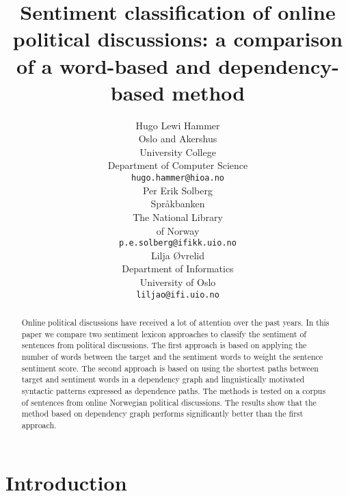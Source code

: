 \documentclass[11pt]{article}
\title{Sentiment classification of online political discussions: a comparison of a word-based and dependency-based method}
\author{Hugo Lewi Hammer \\
  Oslo and Akershus \\ University College \\ Department of Computer Science \\
  {\tt hugo.hammer@hioa.no} \\ \And
  Per Erik Solberg \\
   Spr\aa kbanken \\ The National Library \\ of Norway\\
  {\tt p.e.solberg@ifikk.uio.no}\\ \And
  Lilja \O vrelid \\
   Department of Informatics \\ University of Oslo\\
  {\tt liljao@ifi.uio.no}}
\date{}
\begin{document}


\maketitle
\begin{abstract}
Online political discussions have received a lot of attention over the past years. In this paper we compare two sentiment lexicon approaches to classify the sentiment of sentences from political discussions.
The first approach is based on applying the number of words between the target and the sentiment words to weight the sentence sentiment score. The second approach is based on using the shortest paths between target and sentiment words in a dependency graph and linguistically motivated syntactic patterns expressed as dependence paths. The methods is tested on a corpus of sentences from online Norwegian political discussions. The results show that the method based on dependency graph performs significantly better than the first approach. 
\end{abstract}


\section{Introduction}
\label{sec:introduction}


\end{document}

